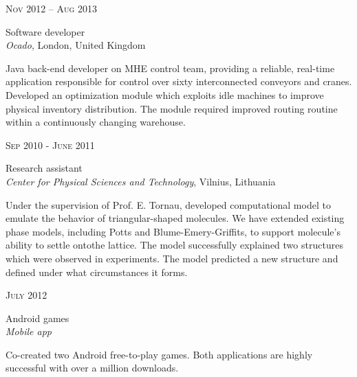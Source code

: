 \documentclass[10pt]{article} %
\begin{document}
{\begin{minipage}[t]{0.5\textwidth}
{\raggedleft\textsc{Nov 2012 – Aug 2013}\par}

{\raggedright\large Software developer\\
\textit{Ocado}, London, United Kingdom\\[5pt]}

\normalsize{Java back-end developer on MHE control team,
providing a reliable, real-time application responsible for
control over sixty interconnected conveyors and cranes.
Developed an optimization module which exploits idle machines
to improve physical inventory distribution.
The module required improved routing routine within a continuously changing warehouse.}\\


\vspace{0.5cm}
{\raggedleft\textsc{Sep 2010 - June 2011}\par}

{\raggedright\large Research assistant\\
\textit{Center for Physical Sciences and Technology}, Vilnius, Lithuania\\[5pt]}

\normalsize{Under the supervision of Prof. E. Tornau,
 developed computational model to emulate the behavior
of triangular-shaped molecules. We have extended existing
phase models, including Potts and Blume-Emery-Griffits,
to support molecule's ability to settle ontothe lattice.
The model successfully explained two structures which were observed in experiments.
The model predicted a new structure and defined under what circumstances it forms.}\\



\vspace{0.5cm}
{\raggedleft\textsc{July 2012}\par}

{\raggedright\large Android games\\
\textit{Mobile app}\\[5pt]}

\normalsize{Co-created two Android free-to-play games.
Both applications are highly successful with over a million downloads.}\\


\end{minipage}}
\end{document}
